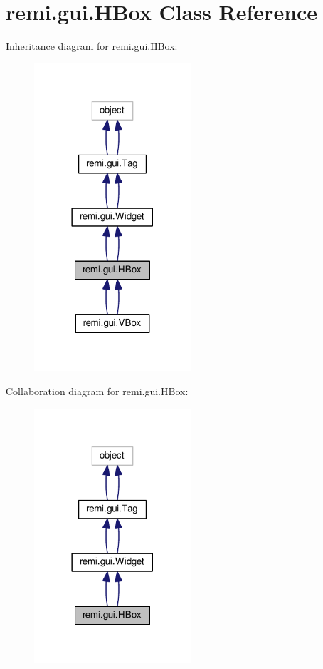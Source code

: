 \hypertarget{classremi_1_1gui_1_1HBox}{}\section{remi.\+gui.\+H\+Box Class Reference}
\label{classremi_1_1gui_1_1HBox}


Inheritance diagram for remi.\+gui.\+H\+Box\+:
\nopagebreak
\begin{figure}[H]
\begin{center}
\leavevmode
\includegraphics[width=165pt]{d2/de2/classremi_1_1gui_1_1HBox__inherit__graph}
\end{center}
\end{figure}


Collaboration diagram for remi.\+gui.\+H\+Box\+:
\nopagebreak
\begin{figure}[H]
\begin{center}
\leavevmode
\includegraphics[width=165pt]{d4/df4/classremi_1_1gui_1_1HBox__coll__graph}
\end{center}
\end{figure}
